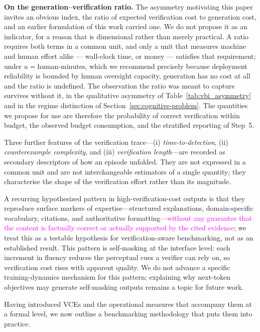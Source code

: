 \documentclass[11pt]{article}
\newcommand{\rev}[1]{\textcolor{magenta}{#1}}
\newcommand{\cfix}[1]{\textcolor{green!50!black}{#1}}
\newcommand{\viola}[1]{\textcolor[HTML]{7030A0}{#1}}
\newcommand{\rev}[1]{#1}
\newcommand{\cfix}[1]{#1}
\newcommand{\viola}[1]{#1}
\begin{document}
\viola{\textbf{On the generation--verification ratio.} The asymmetry motivating this paper invites an obvious index, the ratio of expected verification cost to generation cost, and an earlier formulation of this work carried one. We do not propose it as an indicator, for a reason that is dimensional rather than merely practical. A ratio requires both terms in a common unit, and only a unit that measures machine and human effort alike --- wall-clock time, or money --- satisfies that requirement; under $u=\text{human-minutes}$, which we recommend precisely because deployment reliability is bounded by human oversight capacity, generation has no cost at all and the ratio is undefined. The observation the ratio was meant to capture survives without it, in the qualitative asymmetry of Table~\ref{tab:vbi_asymmetry} and in the regime distinction of Section~\ref{sec:cognitive-problem}. \viola{The quantities we propose for use are therefore the probability of correct verification within budget, the observed budget consumption, and the stratified reporting of Step~5.}}

\viola{Three further features of the verification trace---(i) \textit{time-to-detection}, (ii) \textit{counterexample complexity}, and (iii) \textit{verification length}---are recorded as secondary descriptors of how an episode unfolded. They are not expressed in a common unit and are not interchangeable estimators of a single quantity; they characterise the shape of the verification effort rather than its magnitude.}

{\cfix{A recurring hypothesized pattern in high-verification-cost outputs is that they reproduce surface markers of expertise---structured explanations, domain-specific vocabulary, citations, and authoritative formatting---}\rev{without any guarantee that the content is factually correct or actually supported by the cited evidence}\cfix{; we treat this as a testable hypothesis for verification-aware benchmarking, not as an established result}. This pattern is self-masking at the interface level: each increment in fluency reduces the perceptual cues a verifier can rely on, so verification cost rises with apparent quality. We do not advance a specific training-dynamics mechanism for this pattern; explaining why next-token objectives may generate self-masking outputs remains a topic for future work.}

\viola{Having introduced VCEs and the operational measures that accompany them at a formal level, we now outline a benchmarking methodology that puts them into practice.}
\end{document}
